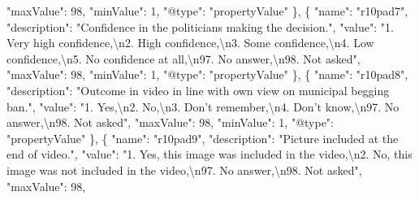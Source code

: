 \documentclass[
]{book}
\newenvironment{Shaded}{\begin{snugshade}}{\end{snugshade}}
\newcommand{\CharTok}[1]{\textcolor[rgb]{0.31,0.60,0.02}{#1}}
\newcommand{\DataTypeTok}[1]{\textcolor[rgb]{0.13,0.29,0.53}{#1}}
\newcommand{\DecValTok}[1]{\textcolor[rgb]{0.00,0.00,0.81}{#1}}
\newcommand{\FunctionTok}[1]{\textcolor[rgb]{0.00,0.00,0.00}{#1}}
\newcommand{\OtherTok}[1]{\textcolor[rgb]{0.56,0.35,0.01}{#1}}
\newcommand{\StringTok}[1]{\textcolor[rgb]{0.31,0.60,0.02}{#1}}
\begin{document}
\begin{Shaded}
\begin{Highlighting}[]
      \DataTypeTok{"maxValue"}\FunctionTok{:} \DecValTok{98}\FunctionTok{,}
      \DataTypeTok{"minValue"}\FunctionTok{:} \DecValTok{1}\FunctionTok{,}
      \DataTypeTok{"@type"}\FunctionTok{:} \StringTok{"propertyValue"}
    \FunctionTok{\}}\OtherTok{,}
    \FunctionTok{\{}
      \DataTypeTok{"name"}\FunctionTok{:} \StringTok{"r10pad7"}\FunctionTok{,}
      \DataTypeTok{"description"}\FunctionTok{:} \StringTok{"Confidence in the politicians making the decision."}\FunctionTok{,}
      \DataTypeTok{"value"}\FunctionTok{:} \StringTok{"1. Very high confidence,}\CharTok{\textbackslash{}n}\StringTok{2. High confidence,}\CharTok{\textbackslash{}n}\StringTok{3. Some confidence,}\CharTok{\textbackslash{}n}\StringTok{4. Low confidence,}\CharTok{\textbackslash{}n}\StringTok{5. No confidence at all,}\CharTok{\textbackslash{}n}\StringTok{97. No answer,}\CharTok{\textbackslash{}n}\StringTok{98. Not asked"}\FunctionTok{,}
      \DataTypeTok{"maxValue"}\FunctionTok{:} \DecValTok{98}\FunctionTok{,}
      \DataTypeTok{"minValue"}\FunctionTok{:} \DecValTok{1}\FunctionTok{,}
      \DataTypeTok{"@type"}\FunctionTok{:} \StringTok{"propertyValue"}
    \FunctionTok{\}}\OtherTok{,}
    \FunctionTok{\{}
      \DataTypeTok{"name"}\FunctionTok{:} \StringTok{"r10pad8"}\FunctionTok{,}
      \DataTypeTok{"description"}\FunctionTok{:} \StringTok{"Outcome in video in line with own view on municipal begging ban."}\FunctionTok{,}
      \DataTypeTok{"value"}\FunctionTok{:} \StringTok{"1. Yes,}\CharTok{\textbackslash{}n}\StringTok{2. No,}\CharTok{\textbackslash{}n}\StringTok{3. Don't remember,}\CharTok{\textbackslash{}n}\StringTok{4. Don't know,}\CharTok{\textbackslash{}n}\StringTok{97. No answer,}\CharTok{\textbackslash{}n}\StringTok{98. Not asked"}\FunctionTok{,}
      \DataTypeTok{"maxValue"}\FunctionTok{:} \DecValTok{98}\FunctionTok{,}
      \DataTypeTok{"minValue"}\FunctionTok{:} \DecValTok{1}\FunctionTok{,}
      \DataTypeTok{"@type"}\FunctionTok{:} \StringTok{"propertyValue"}
    \FunctionTok{\}}\OtherTok{,}
    \FunctionTok{\{}
      \DataTypeTok{"name"}\FunctionTok{:} \StringTok{"r10pad9"}\FunctionTok{,}
      \DataTypeTok{"description"}\FunctionTok{:} \StringTok{"Picture included at the end of video."}\FunctionTok{,}
      \DataTypeTok{"value"}\FunctionTok{:} \StringTok{"1. Yes, this image was included in the video,}\CharTok{\textbackslash{}n}\StringTok{2. No, this image was not included in the video,}\CharTok{\textbackslash{}n}\StringTok{97. No answer,}\CharTok{\textbackslash{}n}\StringTok{98. Not asked"}\FunctionTok{,}
      \DataTypeTok{"maxValue"}\FunctionTok{:} \DecValTok{98}\FunctionTok{,}

\end{Highlighting}
\end{Shaded}
\end{document}
